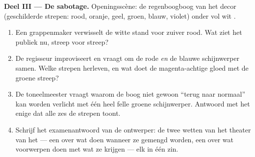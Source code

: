 \begin{problem}
\medskip\noindent\textbf{Deel III --- De sabotage.}
Openingsscène: de regenboogboog van het decor (geschilderde strepen:
rood, oranje, geel, groen, blauw, violet) onder vol wit
.
\begin{enumerate}[resume]
  \item Een grappenmaker verwisselt de witte stand voor zuiver rood.
        Wat ziet het publiek nu, streep voor streep?
  \item De regisseur improviseert en vraagt om de rode \emph{en} de
        blauwe schijnwerper samen. Welke strepen herleven, en wat doet
        de magenta-achtige gloed met de groene streep?
  \item De toneelmeester vraagt waarom de boog niet gewoon ``terug
        naar normaal'' kan worden verlicht met één heel felle groene
        schijnwerper. Antwoord met het enige  dat alle zes
        de strepen toont.
  \item Schrijf het examenantwoord van de ontwerper: de twee wetten
        van het theater van het  --- een over wat
         doen wanneer ze gemengd worden, een over wat
        voorwerpen doen met wat ze krijgen --- elk in één zin.
\end{enumerate}
\end{problem}
